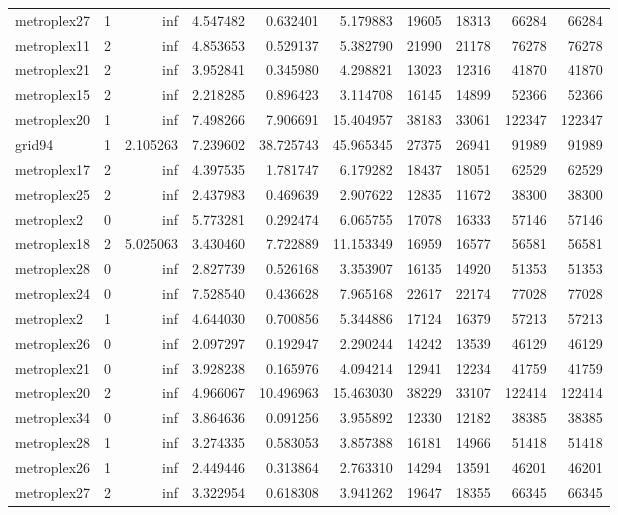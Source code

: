 \begin{longtable}{|l|r|r|r|r|r|r|r|r|r|}
metroplex27 & 1 & inf & 4.547482 & 0.632401 & 5.179883 & 19605 & 18313 & 66284 & 66284 \\
metroplex11 & 2 & inf & 4.853653 & 0.529137 & 5.382790 & 21990 & 21178 & 76278 & 76278 \\
metroplex21 & 2 & inf & 3.952841 & 0.345980 & 4.298821 & 13023 & 12316 & 41870 & 41870 \\
metroplex15 & 2 & inf & 2.218285 & 0.896423 & 3.114708 & 16145 & 14899 & 52366 & 52366 \\
metroplex20 & 1 & inf & 7.498266 & 7.906691 & 15.404957 & 38183 & 33061 & 122347 & 122347 \\
grid94 & 1 & 2.105263 & 7.239602 & 38.725743 & 45.965345 & 27375 & 26941 & 91989 & 91989 \\
metroplex17 & 2 & inf & 4.397535 & 1.781747 & 6.179282 & 18437 & 18051 & 62529 & 62529 \\
metroplex25 & 2 & inf & 2.437983 & 0.469639 & 2.907622 & 12835 & 11672 & 38300 & 38300 \\
metroplex2 & 0 & inf & 5.773281 & 0.292474 & 6.065755 & 17078 & 16333 & 57146 & 57146 \\
metroplex18 & 2 & 5.025063 & 3.430460 & 7.722889 & 11.153349 & 16959 & 16577 & 56581 & 56581 \\
metroplex28 & 0 & inf & 2.827739 & 0.526168 & 3.353907 & 16135 & 14920 & 51353 & 51353 \\
metroplex24 & 0 & inf & 7.528540 & 0.436628 & 7.965168 & 22617 & 22174 & 77028 & 77028 \\
metroplex2 & 1 & inf & 4.644030 & 0.700856 & 5.344886 & 17124 & 16379 & 57213 & 57213 \\
metroplex26 & 0 & inf & 2.097297 & 0.192947 & 2.290244 & 14242 & 13539 & 46129 & 46129 \\
metroplex21 & 0 & inf & 3.928238 & 0.165976 & 4.094214 & 12941 & 12234 & 41759 & 41759 \\
metroplex20 & 2 & inf & 4.966067 & 10.496963 & 15.463030 & 38229 & 33107 & 122414 & 122414 \\
metroplex34 & 0 & inf & 3.864636 & 0.091256 & 3.955892 & 12330 & 12182 & 38385 & 38385 \\
metroplex28 & 1 & inf & 3.274335 & 0.583053 & 3.857388 & 16181 & 14966 & 51418 & 51418 \\
metroplex26 & 1 & inf & 2.449446 & 0.313864 & 2.763310 & 14294 & 13591 & 46201 & 46201 \\
metroplex27 & 2 & inf & 3.322954 & 0.618308 & 3.941262 & 19647 & 18355 & 66345 & 66345 \\

\end{longtable}
